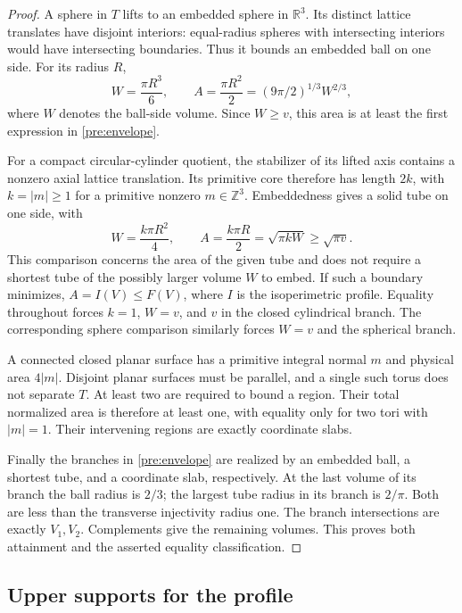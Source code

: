 \begin{proof}
A sphere in \(T\) lifts to an embedded sphere in \(\mathbb R^3\).
Its distinct lattice translates have disjoint interiors: equal-radius
spheres with intersecting interiors would have intersecting boundaries.
Thus it bounds an embedded ball on one side. For its radius \(R\),
\[
 W=\frac{\pi R^3}{6},\qquad A=\frac{\pi R^2}{2}
       =(9\pi/2)^{1/3}W^{2/3},
\]
where \(W\) denotes the ball-side volume. Since \(W\ge v\), this area
is at least the first expression in \eqref{pre:envelope}.

For a compact circular-cylinder quotient, the stabilizer of its lifted
axis contains a nonzero axial lattice translation. Its primitive core
therefore has length \(2k\), with \(k=|m|\ge1\) for a primitive nonzero
\(m\in\mathbb Z^3\). Embeddedness gives a solid tube on one side, with
\[
 W=\frac{k\pi R^2}{4},\qquad A=\frac{k\pi R}{2}
       =\sqrt{\pi kW}\ge\sqrt{\pi v}.
\]
This comparison concerns the area of the given tube and does not require
a shortest tube of the possibly larger volume \(W\) to embed.
If such a boundary minimizes, \(A=I(V)\le F(V)\), where \(I\) is the
isoperimetric profile. Equality throughout forces \(k=1\), \(W=v\),
and \(v\) in the closed cylindrical branch. The corresponding sphere
comparison similarly forces \(W=v\) and the spherical branch.

A connected closed planar surface has a primitive integral normal
\(m\) and physical area \(4|m|\). Disjoint planar surfaces must be
parallel, and a single such torus does not separate \(T\). At least
two are required to bound a region. Their total normalized area is
therefore at least one, with equality only for two tori with
\(|m|=1\). Their intervening regions are exactly coordinate slabs.

Finally the branches in \eqref{pre:envelope} are realized by an embedded
ball, a shortest tube, and a coordinate slab, respectively. At the last
volume of its branch the ball radius is \(2/3\); the largest tube radius
in its branch is \(2/\pi\). Both are less than the transverse injectivity
radius one. The branch intersections are exactly \(V_1,V_2\).
Complements give the remaining volumes. This proves both attainment
and the asserted equality classification.
\end{proof}

\subsection{Upper supports for the profile}

